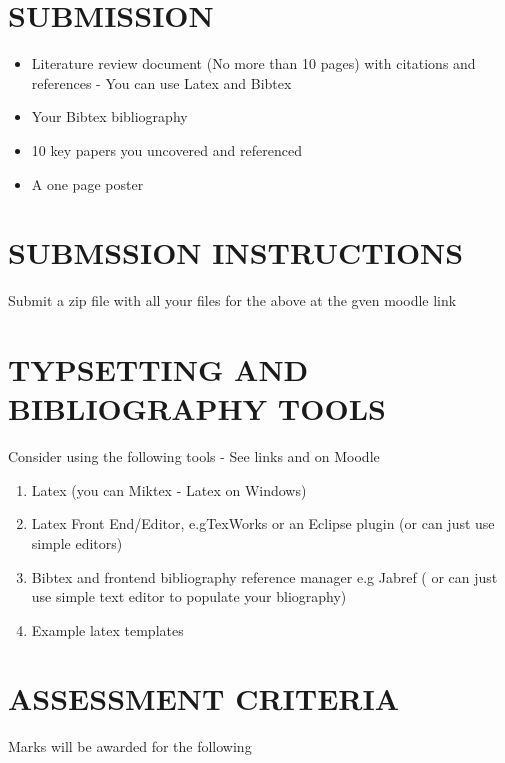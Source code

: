 \documentclass[11pt]{article} %
\begin{document}
\section{SUBMISSION}
\begin{itemize}
\item Literature review document (No more than 10 pages) with citations and references - You can use Latex and Bibtex
\item Your Bibtex bibliography
\item 10 key papers you uncovered and referenced
\item  A one page poster
\end{itemize}

\section{SUBMSSION INSTRUCTIONS}

\noindent  Submit a zip file with all your files for the above at the gven moodle link

\section {TYPSETTING AND BIBLIOGRAPHY TOOLS}
\noindent Consider using the following tools - See links and on Moodle
\begin{enumerate}

\item Latex (you can Miktex - Latex on Windows)
\item Latex Front End/Editor, e.gTexWorks or an Eclipse plugin  (or can just use simple editors)
\item Bibtex and frontend bibliography reference manager e.g Jabref ( or can just use simple text editor to populate your bliography)
\item Example latex templates 
\end{enumerate}

\section{ASSESSMENT CRITERIA}

\noindent Marks will be awarded for the following
\end{document}
